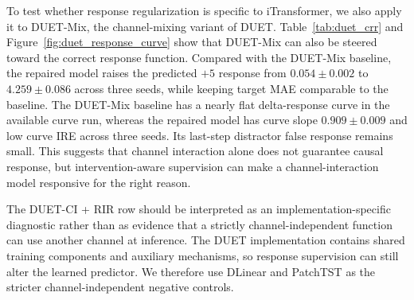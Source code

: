 \documentclass{article}
\begin{document}
To test whether response regularization is specific to iTransformer, we also apply it
to DUET-Mix, the channel-mixing variant of DUET. Table~\ref{tab:duet_crr} and
Figure~\ref{fig:duet_response_curve} show that DUET-Mix can also be steered toward
the correct response function. Compared with the DUET-Mix baseline, the repaired
model raises the predicted $+5$ response from $0.054\pm0.002$ to
$4.259\pm0.086$ across three seeds, while keeping target MAE comparable to the
baseline. The DUET-Mix baseline has a nearly flat delta-response curve in the
available curve run, whereas the repaired model has curve slope
$0.909\pm0.009$ and low curve IRE across three seeds. Its last-step distractor false
response remains small. This suggests that channel interaction alone does not
guarantee causal response, but intervention-aware supervision can make a
channel-interaction model responsive for the right reason.

\begin{table}[t]
\centering
\caption{DUET-Mix repair with randomized response regularization, reported as
mean $\pm$ standard deviation across three seeds. The baseline has low
observational error but near-zero cause response. RIR recovers most of the expected
H1 effect and substantially reduces target-history sensitivity. Curve statistics for
the baseline are available for one seed; RIR curve statistics are computed over
three seeds.}
\label{tab:duet_crr}
\end{table}

The DUET-CI + RIR row should be interpreted as an implementation-specific diagnostic
rather than as evidence that a strictly channel-independent function can use another
channel at inference. The DUET implementation contains shared training components and
auxiliary mechanisms, so response supervision can still alter the learned predictor.
We therefore use DLinear and PatchTST as the stricter channel-independent negative
controls.
\end{document}
